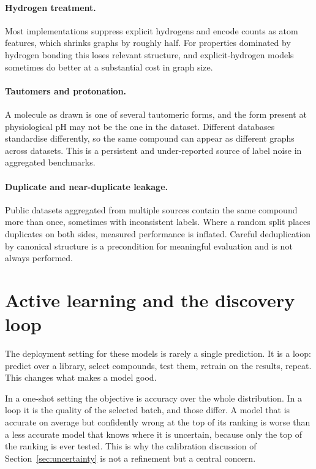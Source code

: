 \documentclass[11pt,a4paper]{article}
\begin{document}
\paragraph{Hydrogen treatment.}
Most implementations suppress explicit hydrogens and encode counts as atom
features, which shrinks graphs by roughly half. For properties dominated by
hydrogen bonding this loses relevant structure, and explicit-hydrogen models
sometimes do better at a substantial cost in graph size.

\paragraph{Tautomers and protonation.}
A molecule as drawn is one of several tautomeric forms, and the form present
at physiological pH may not be the one in the dataset. Different databases
standardise differently, so the same compound can appear as different graphs
across datasets. This is a persistent and under-reported source of label noise
in aggregated benchmarks.

\paragraph{Duplicate and near-duplicate leakage.}
Public datasets aggregated from multiple sources contain the same compound
more than once, sometimes with inconsistent labels. Where a random split
places duplicates on both sides, measured performance is inflated. Careful
deduplication by canonical structure is a precondition for meaningful
evaluation and is not always performed.

\section{Active learning and the discovery loop}
\label{sec:activelearning}

The deployment setting for these models is rarely a single prediction. It is a
loop: predict over a library, select compounds, test them, retrain on the
results, repeat. This changes what makes a model good.

In a one-shot setting the objective is accuracy over the whole distribution.
In a loop it is the quality of the selected batch, and those differ. A model
that is accurate on average but confidently wrong at the top of its ranking is
worse than a less accurate model that knows where it is uncertain, because
only the top of the ranking is ever tested. This is why the calibration
discussion of Section~\ref{sec:uncertainty} is not a refinement but a central
concern.
\end{document}
